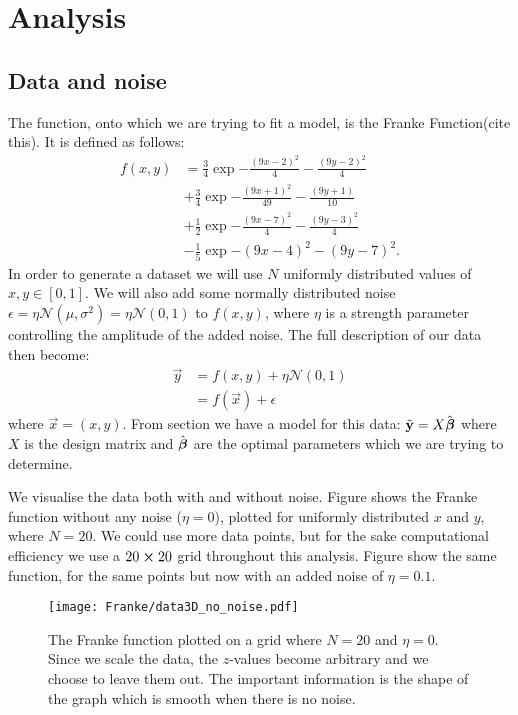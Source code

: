 \section{Analysis}\label{sec:analysis}

    \subsection{Data and noise}\label{sec:data}
        The function, onto which we are trying to fit a model, is the Franke Function(cite this). It is defined as follows:
        \begin{align}\label{eq:francefunc}
            f(x,y) &= \frac{3}{4}\exp{-\frac{(9x-2)^2}{4}-\frac{(9y-2)^2}{4}} \nonumber\\
            &+ \frac{3}{4}\exp{-\frac{(9x+1)^2}{49}-\frac{(9y+1)}{10}} \nonumber\\
            &+ \frac{1}{2}\exp{-\frac{(9x-7)^2}{4}-\frac{(9y-3)^2}{4}} \nonumber\\
            &-\frac{1}{5}\exp{-(9x-4)^2-(9y-7)^2}.
        \end{align}
        In order to generate a dataset we will use $N$ uniformly distributed values of $x,y\in[0,1]$. We will also add some normally distributed noise $\epsilon = \eta\mathcal{N}(\mu,\sigma^2) = \eta\mathcal{N}(0,1)$ to $f(x,y)$, where $\eta$ is a strength parameter controlling the amplitude of the added noise. The full description of our data then become:
        \begin{align}\label{eq:datadescription}
            \vec{y} &= f(x,y) + \eta\mathcal{N}(0,1) \nonumber \\
            &= f(\vec{x}) + \epsilon
        \end{align}
        where $\vec{x} = (x,y)$. 
        From section  we have a model for this data: $\tilde{\mathbf{y}} = X\hat{\boldsymbol{\beta}}$ where $X$ is the design matrix and $\hat{\boldsymbol{\beta}}$ are the optimal parameters which we are trying to determine. 

        We visualise the data both with and without noise. Figure  shows the Franke function without any noise ($\eta=0$), plotted for uniformly distributed $x$ and $y$, where $N=20$. We could use more data points, but for the sake computational efficiency we use a $20\cross20$ grid throughout this analysis.  Figure  show the same function, for the same points but now with an added noise of $\eta=0.1$.

        \begin{figure}
            \texttt{[image: Franke/data3D\_no\_noise.pdf]}
            \caption{The Franke function plotted on a grid where $N=20$ and $\eta=0$. Since we scale the data, the $z$-values become arbitrary and we choose to leave them out. The important information is the shape of the graph which is smooth when there is no noise. }
            \label{fig:franke_function}
        \end{figure}

